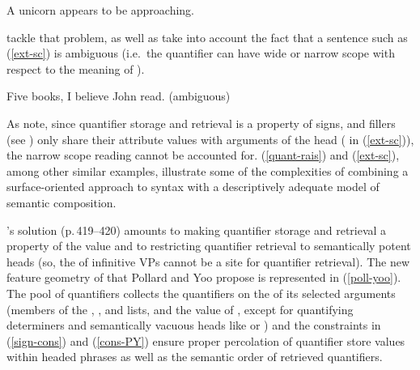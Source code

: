 \documentclass[output=paper
 	        ,biblatex
                ,babelshorthands
                ,newtxmath
                ,draftmode
                ,colorlinks, citecolor=brown
]{langscibook}
\begin{document}
\begin{exe}
\ex\label{quant-rais}A unicorn appears to be approaching.
\end{exe}

\noindent
\citet{PollardandYoo1998} tackle that problem, as well as take into account the fact that a sentence such as (\ref{ext-sc}) is ambiguous (i.e.\ the quantifier  can have wide or narrow scope with respect to the meaning of ). 
\begin{exe}
\ex\label{ext-sc}
Five books, I believe John read. (ambiguous)
\end{exe}

As \citeauthor{PollardandYoo1998} note, since quantifier storage and retrieval is a property of signs, and fillers (see ) only share their  attribute values with arguments of the head ( in (\ref{ext-sc})), the narrow scope reading cannot be accounted for. (\ref{quant-rais}) and (\ref{ext-sc}), among other similar examples, illustrate some of the complexities of combining a surface-oriented approach to syntax with a descriptively adequate model of semantic composition.



\citeauthor{PollardandYoo1998}'s solution (p.\,419--420) amounts to making quantifier storage and retrieval a property of the  value  and to restricting quantifier retrieval to semantically potent heads (so, the  of infinitive VPs cannot be a site for quantifier retrieval). The new feature geometry of  that Pollard and Yoo propose is represented in (\ref{poll-yoo}). The pool of quantifiers collects the quantifiers on the  of its selected arguments (members of the , , and  lists, and the value of , except for quantifying determiners and semantically vacuous heads like  or ) and the constraints in (\ref{sign-cons}) and (\ref{cons-PY}) \citep[423]{PollardandYoo1998} ensure proper percolation of quantifier store values within headed phrases as well as the semantic order of retrieved quantifiers.

\begin{exe}
\ex\label{poll-yoo}

\end{exe}
\end{document}
